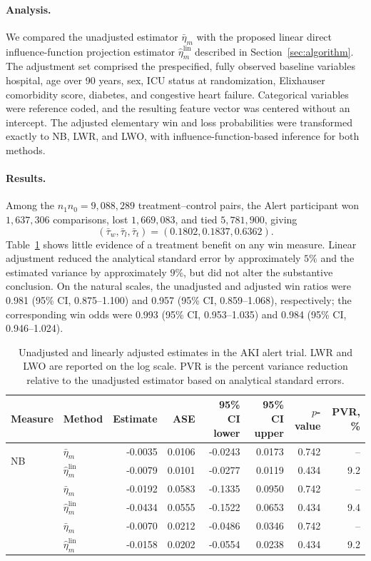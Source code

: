 \paragraph{Analysis.}
We compared the unadjusted estimator $\bar\eta_m$ with the proposed linear direct
influence-function projection estimator $\widehat\eta_m^{\mathrm{lin}}$ described in
Section~\ref{sec:algorithm}. The adjustment set comprised the prespecified, fully observed
baseline variables hospital, age over 90 years, sex, ICU status at randomization,
Elixhauser comorbidity score, diabetes, and congestive heart failure. Categorical variables
were reference coded, and the resulting feature vector was centered without an intercept.
The adjusted elementary win and loss probabilities were transformed exactly to NB, LWR,
and LWO, with influence-function-based inference for both methods.

\paragraph{Results.}
Among the $n_1n_0=9{,}088{,}289$ treatment--control pairs, the Alert participant won
$1{,}637{,}306$ comparisons, lost $1{,}669{,}083$, and tied $5{,}781{,}900$, giving
\[
  (\bar\tau_w,\bar\tau_l,\bar\tau_t)
  =(0.1802,0.1837,0.6362).
\]
Table~\ref{tab:trial3_primary} shows little evidence of a treatment benefit on any win
measure. Linear adjustment reduced the analytical standard error by approximately $5\%$
and the estimated variance by approximately $9\%$, but did not alter the substantive
conclusion. On the natural scales, the unadjusted and adjusted win ratios were 0.981
(95\% CI, 0.875--1.100) and 0.957 (95\% CI, 0.859--1.068), respectively; the corresponding
win odds were 0.993 (95\% CI, 0.953--1.035) and 0.984 (95\% CI, 0.946--1.024).

\begin{table}[t]
\centering
\small
\caption{Unadjusted and linearly adjusted estimates in the AKI alert trial. LWR and LWO are
reported on the log scale. PVR is the percent variance reduction relative to the
unadjusted estimator based on analytical standard errors.}
\label{tab:trial3_primary}
\setlength{\tabcolsep}{5pt}
\begin{tabular}{llrrrrrr}
\toprule
Measure & Method & Estimate & ASE & 95\% CI lower & 95\% CI upper & $p$-value & PVR, \% \\
\midrule
\multirow{2}{*}{NB}
  & $\bar\eta_m$ & -0.0035 & 0.0106 & -0.0243 & 0.0173 & 0.742 & -- \\
  & $\widehat\eta_m^{\mathrm{lin}}$ & -0.0079 & 0.0101 & -0.0277 & 0.0119 & 0.434 & 9.2 \\
\addlinespace[2pt]
\multirow{2}{*}{LWR}
  & $\bar\eta_m$ & -0.0192 & 0.0583 & -0.1335 & 0.0950 & 0.742 & -- \\
  & $\widehat\eta_m^{\mathrm{lin}}$ & -0.0434 & 0.0555 & -0.1522 & 0.0653 & 0.434 & 9.4 \\
\addlinespace[2pt]
\multirow{2}{*}{LWO}
  & $\bar\eta_m$ & -0.0070 & 0.0212 & -0.0486 & 0.0346 & 0.742 & -- \\
  & $\widehat\eta_m^{\mathrm{lin}}$ & -0.0158 & 0.0202 & -0.0554 & 0.0238 & 0.434 & 9.2 \\
\bottomrule
\end{tabular}
\end{table}
